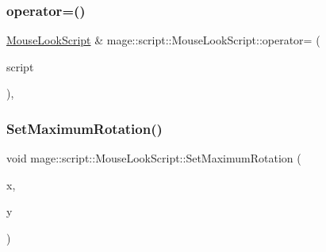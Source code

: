 \hypertarget{classmage_1_1script_1_1_mouse_look_script_aaff03f361a4e302c51e4210bb2e9ca8b}{}\label{classmage_1_1script_1_1_mouse_look_script_aaff03f361a4e302c51e4210bb2e9ca8b} 
\subsubsection{\texorpdfstring{operator=()}{operator=()}\hspace{0.1cm}{\footnotesize\ttfamily [2/2]}}
{\footnotesize\ttfamily \hyperlink{classmage_1_1script_1_1_mouse_look_script}{Mouse\+Look\+Script} \& mage\+::script\+::\+Mouse\+Look\+Script\+::operator= (\begin{DoxyParamCaption}\item[{\hyperlink{classmage_1_1script_1_1_mouse_look_script}{Mouse\+Look\+Script} \&\&}]{script }\end{DoxyParamCaption})\hspace{0.3cm}{\ttfamily [default]}, {\ttfamily [noexcept]}}

\hypertarget{classmage_1_1script_1_1_mouse_look_script_a50c3ddaad18713509394d168cddc8aa8}{}\label{classmage_1_1script_1_1_mouse_look_script_a50c3ddaad18713509394d168cddc8aa8} 
\subsubsection{\texorpdfstring{Set\+Maximum\+Rotation()}{SetMaximumRotation()}\hspace{0.1cm}{\footnotesize\ttfamily [1/3]}}
{\footnotesize\ttfamily void mage\+::script\+::\+Mouse\+Look\+Script\+::\+Set\+Maximum\+Rotation (\begin{DoxyParamCaption}\item[{\hyperlink{namespacemage_aa97e833b45f06d60a0a9c4fc22ae02c0}{F32}}]{x,  }\item[{\hyperlink{namespacemage_aa97e833b45f06d60a0a9c4fc22ae02c0}{F32}}]{y }\end{DoxyParamCaption})\hspace{0.3cm}{\ttfamily [noexcept]}}

